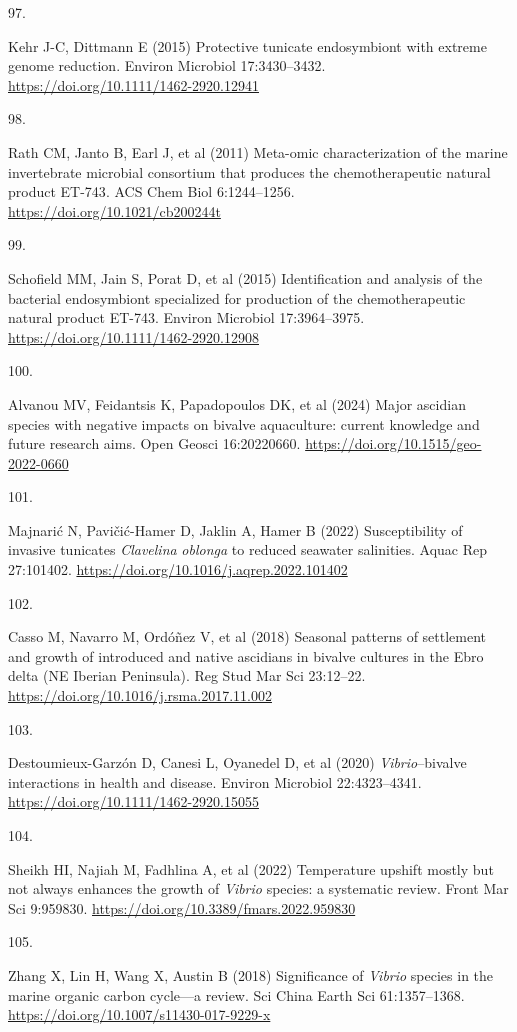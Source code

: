 \documentclass[
  12 pt,
]{article}
\newlength{\cslhangindent}
\newlength{\csllabelwidth}
\newenvironment{CSLReferences}[2] %
 {\begin{list}{}{%
  \setlength{\itemindent}{0pt}
  \setlength{\leftmargin}{0pt}
  \setlength{\parsep}{0pt}
  \ifodd #1
   \setlength{\leftmargin}{\cslhangindent}
   \setlength{\itemindent}{-1\cslhangindent}
  \fi
  \setlength{\itemsep}{#2\baselineskip}}}
 {\end{list}}
\newcommand{\CSLLeftMargin}[1]{\parbox[t]{\csllabelwidth}{\strut#1\strut}}
\newcommand{\CSLRightInline}[1]{\parbox[t]{\linewidth - \csllabelwidth}{\strut#1\strut}}
\begin{document}
\begin{CSLReferences}{0}{0}
\CSLLeftMargin{97. }%
\CSLRightInline{Kehr J-C, Dittmann E (2015) Protective tunicate endosymbiont with extreme genome reduction. Environ Microbiol 17:3430--3432. \url{https://doi.org/10.1111/1462-2920.12941}}

\CSLLeftMargin{98. }%
\CSLRightInline{Rath CM, Janto B, Earl J, et al (2011) Meta-omic characterization of the marine invertebrate microbial consortium that produces the chemotherapeutic natural product {ET-743}. ACS Chem Biol 6:1244--1256. \url{https://doi.org/10.1021/cb200244t}}

\CSLLeftMargin{99. }%
\CSLRightInline{Schofield MM, Jain S, Porat D, et al (2015) Identification and analysis of the bacterial endosymbiont specialized for production of the chemotherapeutic natural product {ET-743}. Environ Microbiol 17:3964--3975. \url{https://doi.org/10.1111/1462-2920.12908}}

\CSLLeftMargin{100. }%
\CSLRightInline{Alvanou MV, Feidantsis K, Papadopoulos DK, et al (2024) Major ascidian species with negative impacts on bivalve aquaculture: current knowledge and future research aims. Open Geosci 16:20220660. \url{https://doi.org/10.1515/geo-2022-0660}}

\CSLLeftMargin{101. }%
\CSLRightInline{Majnarić N, Pavičić-Hamer D, Jaklin A, Hamer B (2022) Susceptibility of invasive tunicates {{\emph{Clavelina}}}{{\emph{ oblonga}}} to reduced seawater salinities. Aquac Rep 27:101402. \url{https://doi.org/10.1016/j.aqrep.2022.101402}}

\CSLLeftMargin{102. }%
\CSLRightInline{Casso M, Navarro M, Ordóñez V, et al (2018) Seasonal patterns of settlement and growth of introduced and native ascidians in bivalve cultures in the {Ebro} delta ({NE Iberian Peninsula}). Reg Stud Mar Sci 23:12--22. \url{https://doi.org/10.1016/j.rsma.2017.11.002}}

\CSLLeftMargin{103. }%
\CSLRightInline{Destoumieux-Garzón D, Canesi L, Oyanedel D, et al (2020) {\emph{Vibrio}}--bivalve interactions in health and disease. Environ Microbiol 22:4323--4341. \url{https://doi.org/10.1111/1462-2920.15055}}

\CSLLeftMargin{104. }%
\CSLRightInline{Sheikh HI, Najiah M, Fadhlina A, et al (2022) Temperature upshift mostly but not always enhances the growth of {{\emph{Vibrio}}} species: a systematic review. Front Mar Sci 9:959830. \url{https://doi.org/10.3389/fmars.2022.959830}}

\CSLLeftMargin{105. }%
\CSLRightInline{Zhang X, Lin H, Wang X, Austin B (2018) Significance of {{\emph{Vibrio}}} species in the marine organic carbon cycle---a review. Sci China Earth Sci 61:1357--1368. \url{https://doi.org/10.1007/s11430-017-9229-x}}

\end{CSLReferences}

\newpage
\end{document}
